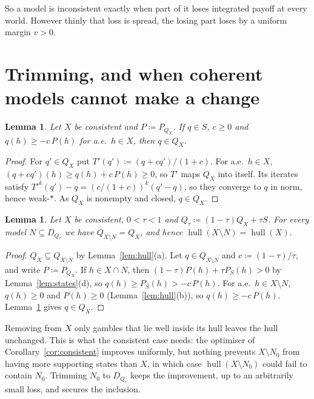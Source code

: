 \documentclass[11pt]{article}
\newcommand{\hull}{\operatorname{hull}}
\theoremstyle{plain}
\newtheorem{lemma}[theorem]{Lemma}
\theoremstyle{definition}
\theoremstyle{remark}
\begin{document}
So a model is inconsistent exactly when part of it loses integrated payoff at every world.
However thinly that loss is spread, the losing part loses by a uniform margin $v>0$.

\section{Trimming, and when coherent models cannot make a change}\label{sec:trim}

\begin{lemma}\label{lem:contraction}
Let $X$ be consistent and $P\coloneqq P_{Q_X}$. If $q\in S$, $c\ge0$ and $q(h)\ge-c\,P(h)$
for a.e.\ $h\in X$, then $q\in Q_X$.
\end{lemma}

\begin{proof}
For $q'\in Q_X$ put $T'(q')\coloneqq(q+cq')/(1+c)$. For a.e.\ $h\in X$, $(q+cq')(h)\ge q(h)+
c\,P(h)\ge0$, so $T'$ maps $Q_X$ into itself. Its iterates satisfy $T'^k(q')-q=(c/(1+c))^k
(q'-q)$, so they converge to $q$ in norm, hence weak-$\ast$. As $Q_X$ is nonempty and closed,
$q\in Q_X$.
\end{proof}

\begin{lemma}\label{lem:trim}
Let $X$ be consistent, $0<\tau<1$ and $Q_\tau\coloneqq(1-\tau)Q_X+\tau S$. For every model
$N\subseteq D_{Q_\tau}$ we have $Q_{X\setminus N}=Q_X$, and hence $\hull(X\setminus N)=
\hull(X)$.
\end{lemma}

\begin{proof}
$Q_X\subseteq Q_{X\setminus N}$ by Lemma~\ref{lem:hull}(a). Let $q\in Q_{X\setminus N}$ and
$c\coloneqq(1-\tau)/\tau$, and write $P\coloneqq P_{Q_X}$. If $h\in X\cap N$, then
$(1-\tau)P(h)+\tau P_S(h)>0$ by Lemma~\ref{lem:states}(d), so $q(h)\ge P_S(h)>-c\,P(h)$. For
a.e.\ $h\in X\setminus N$, $q(h)\ge0$ and $P(h)\ge0$ (Lemma~\ref{lem:hull}(b)), so $q(h)\ge-c
\,P(h)$. Lemma~\ref{lem:contraction} gives $q\in Q_X$.
\end{proof}

Removing from $X$ only gambles that lie well inside its hull leaves the hull unchanged. This
is what the consistent case needs: the optimiser of Corollary~\ref{cor:consistent} improves
uniformly, but nothing prevents $X\setminus N_0$ from having more supporting states than $X$,
in which case $\hull(X\setminus N_0)$ could fail to contain $N_0$. Trimming $N_0$ to
$D_{Q_\tau}$ keeps the improvement, up to an arbitrarily small loss, and secures the
inclusion.
\end{document}
